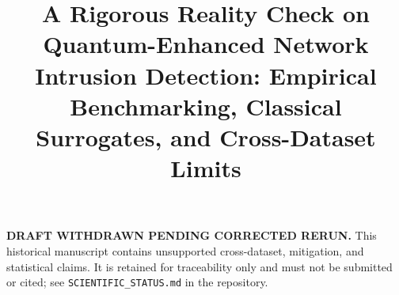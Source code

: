 \documentclass[conference]{IEEEtran}
\begin{document}
\title{A Rigorous Reality Check on Quantum-Enhanced Network Intrusion Detection: Empirical Benchmarking, Classical Surrogates, and Cross-Dataset Limits}

\author{
}

\maketitle

\noindent\textbf{DRAFT WITHDRAWN PENDING CORRECTED RERUN.} This historical
manuscript contains unsupported cross-dataset, mitigation, and statistical
claims. It is retained for traceability only and must not be submitted or cited;
see \texttt{SCIENTIFIC\_STATUS.md} in the repository.
\end{document}

